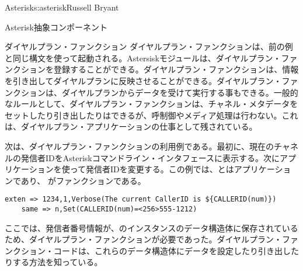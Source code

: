 \begin{aosachapter}{Asterisk}{s:asterisk}{Russell Bryant}
\begin{aosasect1}{Asterisk抽象コンポーネント}
\begin{aosasect2}{ダイヤルプラン・ファンクション}
ダイヤルプラン・ファンクションは、前の例と同じ構文を使って起動される。Astersiskモジュールは、ダイヤルプラン・ファンクションを登録することができる。ダイヤルプラン・ファンクションは、情報を引き出してダイヤルプランに反映させることができる。ダイヤルプラン・ファンクションは、ダイヤルプランからデータを受けて実行する事もできる。一般的なルールとして、ダイヤルプラン・ファンクションは、チャネル・メタデータをセットしたり引き出したりはできるが、呼制御やメディア処理は行わない。これは、ダイヤルプラン・アプリケーションの仕事として残されている。

次は、ダイヤルプラン・ファンクションの利用例である。最初に、現在のチャネルの発信者IDをAsteriskコマンドライン・インタフェースに表示する。次にアプリケーションを使って発信者IDを変更する。この例では、とはアプリケーションであり、 がファンクションである。

\begin{verbatim}
exten => 1234,1,Verbose(The current CallerID is ${CALLERID(num)})
    same => n,Set(CALLERID(num)=<256>555-1212)
\end{verbatim}

\noindent ここでは、発信者番号情報が、のインスタンスのデータ構造体に保存されているため、ダイヤルプラン・ファンクションが必要であった。ダイヤルプラン・ファンクション・コードは、これらのデータ構造体にデータを設定したり引き出したりする方法を知っている。


\end{aosasect2}
\end{aosasect1}
\end{aosachapter}
